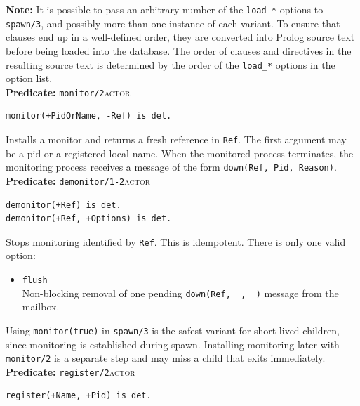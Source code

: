 \smallskip
\noindent \textbf{Note:} It is possible to pass an arbitrary number of the
\texttt{load\_*} options to \texttt{spawn/3}, and possibly more than one
instance of each variant. To ensure that clauses end up in a well-defined
order, they are converted into Prolog source text before being loaded into the
database. The order of clauses and directives in the resulting source text is
determined by the order of the \texttt{load\_*} options in the option list.\\


\noindent \textbf{Predicate:} \texttt{monitor/2}\hfill\textsc{actor}

\begin{verbatim}
monitor(+PidOrName, -Ref) is det.
\end{verbatim}

\noindent Installs a monitor and returns a fresh reference in \texttt{Ref}. The
first argument may be a pid or a registered local name. When the monitored
process terminates, the monitoring process receives a message of the form
\texttt{down(Ref,\,Pid,\,Reason)}.\\

\noindent \textbf{Predicate:} \texttt{demonitor/1-2}\hfill\textsc{actor}

\begin{verbatim}
demonitor(+Ref) is det.
demonitor(+Ref, +Options) is det.
\end{verbatim}

\noindent Stops monitoring identified by \texttt{Ref}. This is idempotent.
There is only one valid option:

\begin{itemize}
\item
  \texttt{flush}\\
  Non-blocking removal of one pending \texttt{down(Ref,\,\_,\,\_)} message
  from the mailbox.
\end{itemize}

\noindent Using \texttt{monitor(true)} in \texttt{spawn/3} is the safest
variant for short-lived children, since monitoring is established during spawn.
Installing monitoring later with \texttt{monitor/2} is a separate step and may
miss a child that exits immediately.\\

\noindent \textbf{Predicate:} \texttt{register/2}\hfill\textsc{actor}

\begin{verbatim}
register(+Name, +Pid) is det.
\end{verbatim}

